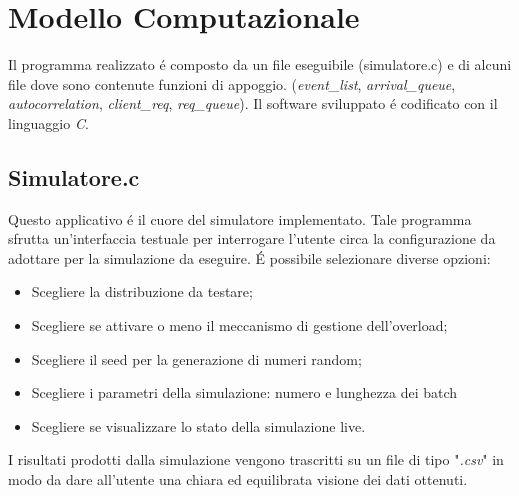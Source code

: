 \chapter{Modello Computazionale}
Il programma realizzato \'e composto da un file eseguibile (simulatore.c) e di 
alcuni file dove sono contenute funzioni di appoggio. (\textit{event\_list}, 
\textit{arrival\_queue}, \textit{autocorrelation}, \textit{client\_req}, 
\textit{req\_queue}).
Il software sviluppato \'e codificato con il linguaggio \textit{C}.

\section{Simulatore.c}

Questo applicativo \'e il cuore del simulatore implementato. Tale programma 
sfrutta un'interfaccia testuale per interrogare l'utente circa la 
configurazione 
da adottare per la simulazione da eseguire. 
\'E possibile selezionare diverse opzioni:
\begin{itemize}
\item Scegliere la distribuzione da testare;
\item Scegliere se attivare o meno il meccanismo di gestione dell'overload;
\item Scegliere il seed per la generazione di numeri random;
\item Scegliere i parametri della simulazione: numero e lunghezza dei batch %
\begin{comment}
\item Scegliere i parametri della simulazione: Start e Stop nel caso non di assenza di overload management.
\end{comment}
\item Scegliere se visualizzare lo stato della simulazione live.
\end{itemize}

I risultati prodotti dalla simulazione vengono trascritti su un file di tipo 
"\textit{.csv}"  in modo da dare all'utente una chiara ed equilibrata visione 
dei dati ottenuti.

